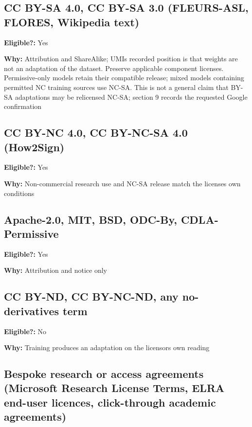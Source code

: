 \documentclass[10pt,a4paper]{article}
\begin{document}
\subsection{CC BY-SA 4.0, CC BY-SA 3.0 (FLEURS-ASL, FLORES, Wikipedia
text)}\label{cc-by-sa-40-cc-by-sa-30-fleurs-asl-flores-wikipedia-text}

\textbf{Eligible?:} Yes

\textbf{Why:} Attribution and ShareAlike; UMI\textquotesingle s recorded
position is that weights are not an adaptation of the dataset. Preserve
applicable component licenses. Permissive-only models retain their
compatible release; mixed models containing permitted NC training
sources use NC-SA. This is not a general claim that BY-SA adaptations
may be relicensed NC-SA; section 9 records the requested Google
confirmation

\subsection{CC BY-NC 4.0, CC BY-NC-SA 4.0
(How2Sign)}\label{cc-by-nc-40-cc-by-nc-sa-40-how2sign}

\textbf{Eligible?:} Yes

\textbf{Why:} Non-commercial research use and NC-SA release match the
license\textquotesingle s own conditions

\subsection{Apache-2.0, MIT, BSD, ODC-By,
CDLA-Permissive}\label{apache-20-mit-bsd-odc-by-cdla-permissive}

\textbf{Eligible?:} Yes

\textbf{Why:} Attribution and notice only

\subsection{CC BY-ND, CC BY-NC-ND, any no-derivatives
term}\label{cc-by-nd-cc-by-nc-nd-any-no-derivatives-term}

\textbf{Eligible?:} No

\textbf{Why:} Training produces an adaptation on the
licensor\textquotesingle s own reading

\subsection{Bespoke research or access agreements (Microsoft Research
License Terms, ELRA end-user licences, click-through academic
agreements)}\label{bespoke-research-or-access-agreements-microsoft-research-license-terms-elra-end-user-licences-click-through-academic-agreements}
\end{document}
